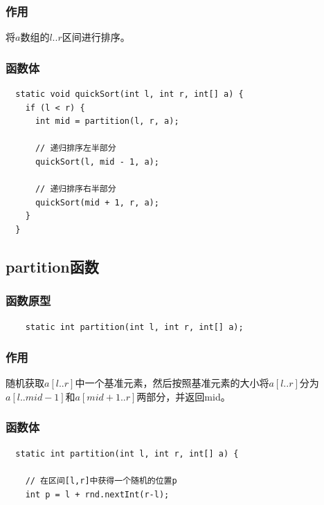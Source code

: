 \documentclass[11pt, a4paper]{article}
\begin{document}
\begin{CJK*}{UTF8}{gbsn}
  \subsubsection{作用}

  将$a$数组的$l..r$区间进行排序。

  \subsubsection{函数体}

  
  \begin{lstlisting}
  static void quickSort(int l, int r, int[] a) {
    if (l < r) {
      int mid = partition(l, r, a);
      
      // 递归排序左半部分
      quickSort(l, mid - 1, a);
      
      // 递归排序右半部分
      quickSort(mid + 1, r, a);  
    }
  }

  \end{lstlisting}

  \subsection{partition函数}
  
  \subsubsection{函数原型}

  \begin{lstlisting}
    static int partition(int l, int r, int[] a);
  \end{lstlisting}

  \subsubsection{作用}

  随机获取$a[l..r]$中一个基准元素，然后按照基准元素的大小将$a[l..r]$分为$a[l..mid-1]$和$a[mid+1..r]$两部分，并返回mid。

  \subsubsection{函数体}
  \begin{lstlisting}
  static int partition(int l, int r, int[] a) {
    
    // 在区间[l,r]中获得一个随机的位置p
    int p = l + rnd.nextInt(r-l);


\end{lstlisting}
\end{CJK*}
\end{document}
